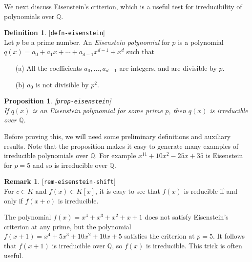 \documentclass{amsart}
\newcommand{\lbl}[1]{\label{#1}\textup{[\texttt{#1}]}\ \\}
\newcommand{\lbl}{\label}
\newcommand{\Q}         {{\mathbb{Q}}}
\renewcommand{\:}{\colon}
\newtheorem{proposition}[theorem]{Proposition}
\theoremstyle{definition}
\newtheorem{remark}[theorem]{Remark}
\newtheorem{definition}[theorem]{Definition}
\begin{document}
We next discuss Eisenstein's criterion, which is a useful test for
irreducibility of polynomials over $\Q$.

\begin{definition}\lbl{defn-eisenstein}
 Let $p$ be a prime number.  An \emph{Eisenstein polynomial} for $p$
 is a polynomial $q(x)=a_0+a_1x+\dotsb+a_{d-1}x^{d-1}+x^d$ such that 
 \begin{itemize}
  \item[(a)] All the coefficients $a_0,\dotsc,a_{d-1}$ are integers,
   and are divisible by $p$.
  \item[(b)] $a_0$ is not divisible by $p^2$.
 \end{itemize}
\end{definition}

\begin{proposition}\lbl{prop-eisenstein}
 If $q(x)$ is an Eisenstein polynomial for some prime $p$, then $q(x)$
 is irreducible over $\Q$.
\end{proposition}

Before proving this, we will need some preliminary definitions and
auxiliary results.  Note that the proposition makes it easy to
generate many examples of irreducible polynomials over $\Q$.  For
example $x^{11}+10x^2-25x+35$ is Eisenstein for $p=5$ and so is
irreducible over $\Q$.

\begin{remark}\lbl{rem-eisenstein-shift}
 For $c\in K$ and $f(x)\in K[x]$, it is easy to see that $f(x)$ is
 reducible if and only if $f(x+c)$ is irreducible.

 The polynomial $f(x)=x^4+x^3+x^2+x+1$ does not satisfy Eisenstein's
 criterion at any prime, but the polynomial
 $f(x+1)=x^4+5x^3+10x^2+10x+5$ satisfies the criterion at $p=5$. It
 follows that $f(x+1)$ is irreducible over $\Q$, so $f(x)$ is
 irreducible.  This trick is often useful.
\end{remark}
\end{document}
